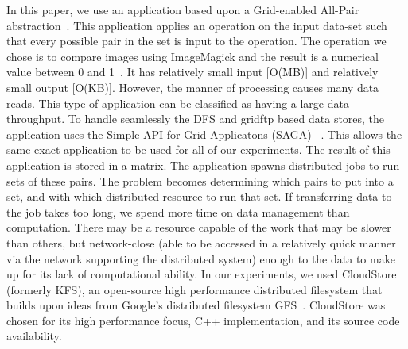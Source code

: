 \documentclass[a4paper,11pt]{article}
\newcommand{\jhanote}[1]{ {\textcolor{red} { ***Jha: #1 }}}
\newcommand{\jhanote}[1]{}
\begin{document}

In this paper, we use an application based upon a Grid-enabled All-Pair
abstraction~\cite{Interop, AllPairs}. This application applies an
operation on the input data-set such that every possible pair in the set
is input to the operation. The operation we chose is to compare images
using ImageMagick and the result is a numerical value between 0 and
1~\cite{imagemagick}. It has relatively small input [O(MB)] and
relatively small output [O(KB)]. However, the manner of processing
causes many data reads. This type of application can be classified as
having a large data throughput. To handle seamlessly the DFS and gridftp
based data stores, the application uses the Simple API for Grid
Applicatons (SAGA) ~\cite{saga_web}. This allows the same exact
application to be used for all of our experiments. The result of this
application is stored in a matrix. The application spawns distributed
jobs to run sets of these pairs. The problem becomes determining which
pairs to put into a set, and with which distributed resource to run that
set. If transferring data to the job takes too long, we spend more time
on data management than computation. There may be a resource capable of
the work that may be slower than others, but network-close (able to be
accessed in a relatively quick manner via the network supporting the
distributed system) enough to the data to make up for its lack of
computational ability. In our experiments, we used CloudStore (formerly
KFS), an open-source high performance distributed filesystem that builds
upon ideas from Google's distributed filesystem GFS~\cite{kfs_web}.
CloudStore was chosen for its high performance focus, C++
implementation, and its source code availability.
\end{document}
